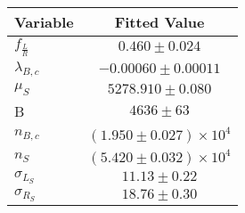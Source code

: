 \begin{tabular}[t]{lc}
\hline
Variable &Fitted Value\\
\hline\hline
$f_{\frac{L}{R}}$&$0.460\pm0.024$\\
\hline
$\lambda_{B,c}$&$-0.00060\pm0.00011$\\
\hline
$\mu_S$&$5278.910\pm0.080$\\
\hline
B&$4636\pm63$\\
\hline
$n_{B,c}$&$(1.950\pm0.027)\times 10^4$\\
\hline
$n_S$&$(5.420\pm0.032)\times 10^4$\\
\hline
$\sigma_{L_S}$&$11.13\pm0.22$\\
\hline
$\sigma_{R_S}$&$18.76\pm0.30$\\
\hline
\end{tabular}